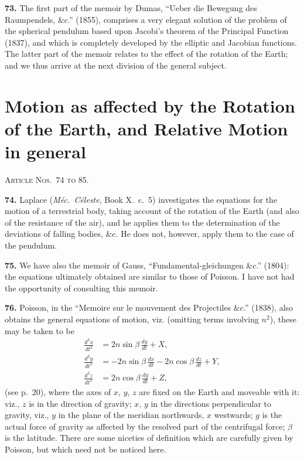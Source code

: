 \documentclass[11pt,a4paper]{article}
\theoremstyle{definition}
\begin{document}
\textbf{73.} The first part of the memoir by Dumas, ``Ueber die Bewegung des Raumpendels, \&c.'' (1855), comprises a very elegant solution of the problem of the spherical pendulum based upon Jacobi's theorem of the Principal Function (1837), and which is completely developed by the elliptic and Jacobian functions. The latter part of the memoir relates to the effect of the rotation of the Earth; and we thus arrive at the next division of the general subject.


\section*{Motion as affected by the Rotation of the Earth, and Relative Motion in general}
\noindent\textsc{Article Nos.~74 to 85.}

\medskip

\textbf{74.} Laplace (\textit{M\'ec.\ C\'eleste}, Book X.~c.~5) investigates the equations for the motion of a terrestrial body, taking account of the rotation of the Earth (and also of the resistance of the air), and he applies them to the determination of the deviations of falling bodies, \&c. He does not, however, apply them to the case of the pendulum.

\textbf{75.} We have also the memoir of Gauss, ``Fundamental-gleichungen \&c.'' (1804): the equations ultimately obtained are similar to those of Poisson. I have not had the opportunity of consulting this memoir.

\textbf{76.} Poisson, in the ``Memoire sur le mouvement des Projectiles \&c.'' (1838), also obtains the general equations of motion, viz. (omitting terms involving $n^2$), these may be taken to be
\begin{align*}
\frac{d^2x}{dt^2} &= 2n\sin\beta\,\frac{dy}{dt} + X, \\
\frac{d^2y}{dt^2} &= -2n\sin\beta\,\frac{dx}{dt} - 2n\cos\beta\,\frac{dz}{dt} + Y, \\
\frac{d^2z}{dt^2} &= 2n\cos\beta\,\frac{dy}{dt} + Z,
\end{align*}
(see p.~20), where the axes of $x$, $y$, $z$ are fixed on the Earth and moveable with it: viz., $z$ is in the direction of gravity; $x$, $y$ in the directions perpendicular to gravity, viz., $y$ in the plane of the meridian northwards, $x$ westwards; $g$ is the actual force of gravity as affected by the resolved part of the centrifugal force; $\beta$ is the latitude. There are some niceties of definition which are carefully given by Poisson, but which need not be noticed here.
\end{document}
